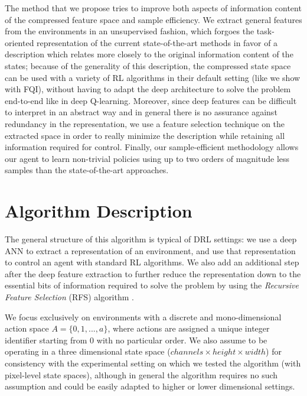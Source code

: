 The method that we propose tries to improve both aspects of information content
of the compressed feature space and sample efficiency. We extract general 
features from the environments in an unsupervised fashion, which forgoes the
task-oriented representation of the current state-of-the-art methods in favor of
a description which relates more closely to the original information content of 
the states; because of the generality of this description, the compressed state 
space can be used with a variety of RL algorithms in their default setting (like
we show with FQI), without having to adapt the deep architecture to solve the 
problem end-to-end like in deep Q-learning.
Moreover, since deep features can be difficult to interpret in an abstract 
way and in general there is no assurance against redundancy in the representation, 
we use a feature selection technique on the extracted space in order to 
really minimize the description while retaining all information required for 
control.
Finally, our sample-efficient methodology allows our agent to learn non-trivial 
policies using up to two orders of magnitude less samples than the state-of-the-art 
approaches.

\section{Algorithm Description}
The general structure of this algorithm is typical of DRL settings: we use a 
deep ANN to extract a representation of an environment, and use that 
representation to control an agent with standard RL algorithms. We also add an 
additional step after the deep feature extraction to further reduce the 
representation down to the essential bits of information required to solve the 
problem by using the \textit{Recursive Feature Selection} (RFS) algorithm 
\cite{castelletti2011tree}.

We focus exclusively on environments with a discrete and mono-dimensional 
action space $A = \{0, 1, ..., a\}$, where actions are assigned a unique integer 
identifier starting from $0$ with no particular order. 
We also assume to be operating in a three dimensional state space 
($channels \times height \times width$) for consistency with the experimental 
setting on which we tested the algorithm (with pixel-level state spaces), 
although in general the algorithm requires no such assumption and could be 
easily adapted to higher or lower dimensional settings. 

